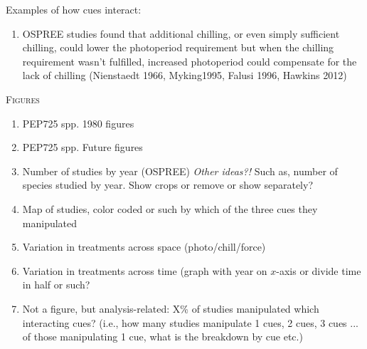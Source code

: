 \documentclass[11pt,letterpaper]{article}
\renewcommand{\section}[1]{%
\bigskip
\begin{center}
\begin{Large}
\normalfont\scshape #1
\medskip
\end{Large}
\end{center}}
\begin{document}
Examples of how cues interact:
\begin{enumerate}
\item OSPREE studies found that additional chilling, or even simply sufficient 	chilling, could lower the photoperiod requirement but when the chilling requirement 	wasn’t fulfilled, increased photoperiod could compensate for the lack of chilling 	(Nienstaedt 1966, Myking1995, Falusi 1996, Hawkins 2012) 
\end{enumerate}


\newpage
\section{Figures}
\begin{enumerate}
\item PEP725 spp. 1980 figures
\item PEP725 spp. Future figures
\item Number of studies by year (OSPREE) \emph{Other ideas?!} Such as, number of species studied by year. Show crops or remove or show separately?
\item Map of studies, color coded or such by which of the three cues they manipulated
\item Variation in treatments across space (photo/chill/force)
\item Variation in treatments across time (graph with year on $x$-axis or divide time in half or such? 
\item Not a figure, but analysis-related: X\% of studies manipulated which interacting cues? (i.e., how many studies manipulate 1 cues, 2 cues, 3 cues ... of those manipulating 1 cue, what is the breakdown by cue etc.)
\end{enumerate}




\end{document}
